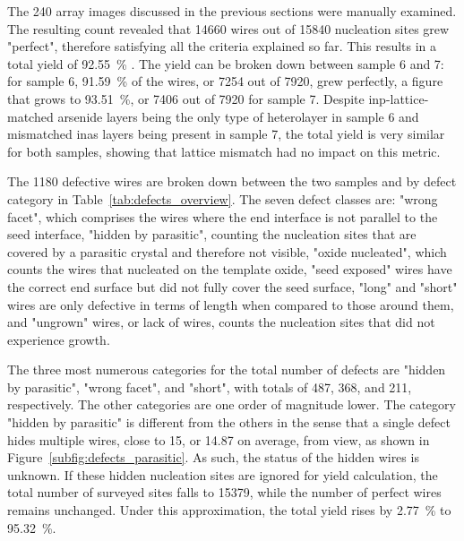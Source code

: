 The \num{240} array images discussed in the previous sections were manually examined. The resulting count revealed that \num{14660} wires out of \num{15840} nucleation sites grew "perfect", therefore satisfying all the criteria explained so far. This results in a total yield of \qty{92.55}{\percent} \cite{Brugnolotto2023_2}. The yield can be broken down between sample 6 and 7: for sample 6, \qty{91.59}{\percent} of the wires, or \num{7254} out of \num{7920}, grew perfectly, a figure that grows to \qty{93.51}{\percent}, or \num{7406} out of \num{7920} for sample 7. Despite \acs{inp}-lattice-matched arsenide layers being the only type of heterolayer in sample 6 and mismatched \acf{inas} layers being present in sample 7, the total yield is very similar for both samples, showing that lattice mismatch had no impact on this metric.

The \num{1180} defective wires are broken down between the two samples and by defect category in Table~\ref{tab:defects_overview}. The seven defect classes are: "wrong facet", which comprises the wires where the end interface is not parallel to the  seed interface, "hidden by parasitic", counting the nucleation sites that are covered by a parasitic crystal and therefore not visible, "oxide nucleated", which counts the wires that nucleated on the template oxide, "seed exposed" wires have the correct end surface but did not fully cover the seed surface, "long" and "short" wires are only defective in terms of length when compared to those around them, and "ungrown" wires, or lack of wires, counts the nucleation sites that did not experience growth.

The three most numerous categories for the total number of defects are "hidden by parasitic", "wrong facet", and "short", with totals of \num{487}, \num{368}, and \num{211}, respectively. The other categories are one order of magnitude lower. The category "hidden by parasitic" is different from the others in the sense that a single defect hides multiple wires, close to \num{15}, or \num{14.87} on average, from view, as shown in Figure~\ref{subfig:defects_parasitic}. As such, the status of the hidden wires is unknown. If these hidden nucleation sites are ignored for yield calculation, the total number of surveyed sites falls to \num{15379}, while the number of perfect wires remains unchanged. Under this approximation, the total yield rises by \qty{2.77}{\percent} to \qty{95.32}{\percent}.

